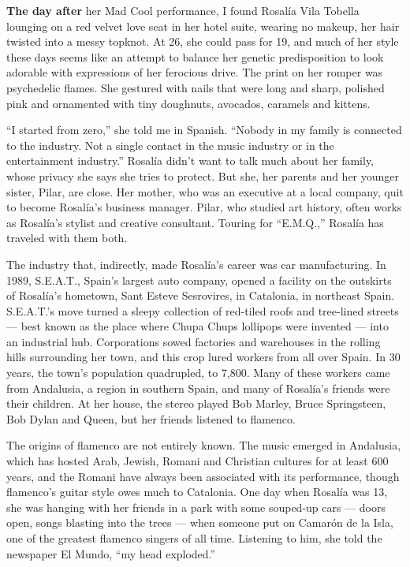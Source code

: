 \textbf{The day after} her Mad Cool performance, I found Rosalía Vila
Tobella lounging on a red velvet love seat in her hotel suite, wearing
no makeup, her hair twisted into a messy topknot. At 26, she could pass
for 19, and much of her style these days seems like an attempt to
balance her genetic predisposition to look adorable with expressions of
her ferocious drive. The print on her romper was psychedelic flames. She
gestured with nails that were long and sharp, polished pink and
ornamented with tiny doughnuts, avocados, caramels and kittens.

``I started from zero,'' she told me in Spanish. ``Nobody in my family
is connected to the industry. Not a single contact in the music industry
or in the entertainment industry.'' Rosalía didn't want to talk much
about her family, whose privacy she says she tries to protect. But she,
her parents and her younger sister, Pilar, are close. Her mother, who
was an executive at a local company, quit to become Rosalía's business
manager. Pilar, who studied art history, often works as Rosalía's
stylist and creative consultant. Touring for ``E.M.Q.,'' Rosalía has
traveled with them both.

The industry that, indirectly, made Rosalía's career was car
manufacturing. In 1989, S.E.A.T., Spain's largest auto company, opened a
facility on the outskirts of Rosalía's hometown, Sant Esteve Sesrovires,
in Catalonia, in northeast Spain. S.E.A.T.'s move turned a sleepy
collection of red-tiled roofs and tree-lined streets --- best known as
the place where Chupa Chups lollipops were invented --- into an
industrial hub. Corporations sowed factories and warehouses in the
rolling hills surrounding her town, and this crop lured workers from all
over Spain. In 30 years, the town's population quadrupled, to 7,800.
Many of these workers came from Andalusia, a region in southern Spain,
and many of Rosalía's friends were their children. At her house, the
stereo played Bob Marley, Bruce Springsteen, Bob Dylan and Queen, but
her friends listened to flamenco.

The origins of flamenco are not entirely known. The music emerged in
Andalusia, which has hosted Arab, Jewish, Romani and Christian cultures
for at least 600 years, and the Romani have always been associated with
its performance, though flamenco's guitar style owes much to Catalonia.
One day when Rosalía was 13, she was hanging with her friends in a park
with some souped-up cars --- doors open, songs blasting into the trees
--- when someone put on Camarón de la Isla, one of the greatest flamenco
singers of all time. Listening to him, she told the newspaper El Mundo,
``my head exploded.''

